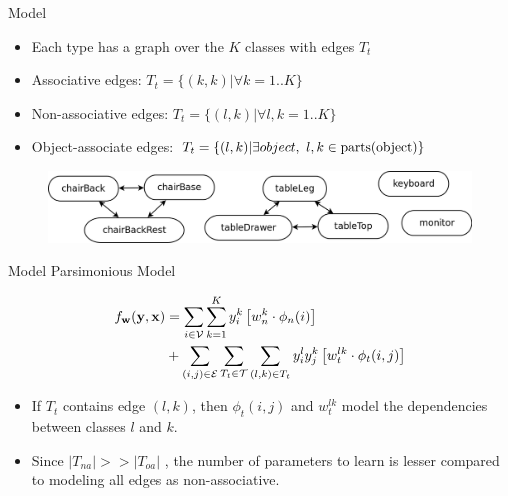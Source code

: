 \documentclass{beamer}
\newcommand{\x}{{\mathbf x}}     %
\newcommand{\y}{{\mathbf y}}     %
\newcommand{\ysc}[2]{{y_{#1}^{#2}}}    %
\newcommand{\fn}[1]{{\phi_n(#1)}}      %
\newcommand{\fe}[3]{{\phi_{#1}(#2,#3)}}%
\newcommand{\w}{{\mathbf w}}           %
\newcommand{\wn}[1]{{w_n^{#1}}}        %
\newcommand{\we}[3]{{w_{#1}^{#2#3}}}   %
\newcommand{\df}[3]{{f_{#3}(#1,#2)}}   %
\begin{document}
\begin{frame}{Model}
\begin{itemize}

\item Each type has a graph over the $K$ classes with edges  $T_t$

\item Associative edges:  ${T_t}=\{(k,k)| \forall k=1..K\}$
\item Non-associative edges: $T_t=\{(l,k)| \forall l,k=1..K\}$
\item Object-associate edges: $T_t=\{(l,k) | \exists object , ~ l,k\in {\rm parts}({\rm object})\}$
\end{itemize}
\hskip 1in
\begin{figure}
		\includegraphics[width=.8\linewidth]{objAssoc.png}
	\end{figure}


\end{frame}

\begin{frame}{Model}
Parsimonious Model



\begin{equation} \label{eq:model}
\begin{split}
\df{\y}{\x}{\w} & = \sum_{i \in \mathcal{V}} \sum_{k=1}^{K} \ysc{i}{k} \left[\wn{k} \cdot \fn{i} \right] \\
 & + \sum_{(i,j)\in \mathcal{E}}   \sum_{T_t \in {\cal T}}  \sum_{(l,k)\in T_t} \ysc{i}{l} \ysc{j}{k}  \left[\we{t}{l}{k} \cdot \fe{t}{i}{j}\right] 
 \end{split}
\end{equation}
\begin{itemize}
\item If $T_t$ contains edge $(l,k)$, then $\fe{t}{i}{j}$ and $\we{t}{l}{k}$  model the dependencies between classes $l$ and $k$.
\item Since $|T_{na}| >> |T_{oa}|$ , the number of parameters to learn is lesser compared to modeling all edges as non-associative.

\end{itemize}
\end{frame}
\end{document}
